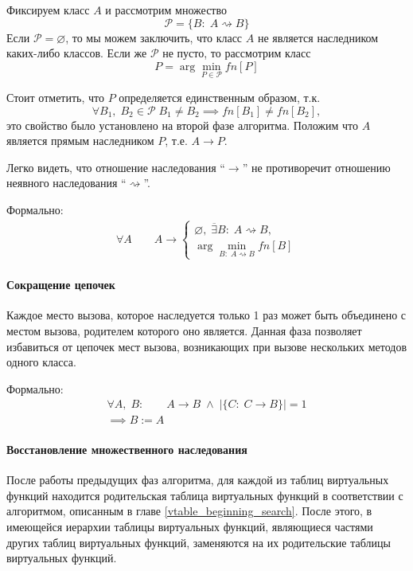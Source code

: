 \documentclass[a4paper,12pt,russian]{article}
\begin{document}
Фиксируем класс $A$ и рассмотрим множество \[\mathcal{P} = \{B:\; A \rightsquigarrow B\}\]
Если $\mathcal{P} = \varnothing$, то мы можем заключить, что класс $A$ не является наследником каких-либо классов. Если же $\mathcal{P}$ не пусто, то рассмотрим класс \[P = \arg \min_{P \in \mathcal{P}}fn[P]\]

Стоит отметить, что $P$ определяется единственным образом, т.к. \[\forall B_1,\;B_2 \in \mathcal{P}\; B_1 \neq B_2 \implies fn[B_1] \neq fn[B_2],\]
это свойство было установлено на второй фазе алгоритма.
Положим что $A$ является прямым наследником $P$, т.е. $A \rightarrow P$.

Легко видеть, что отношение наследования ``$\rightarrow$'' не противоречит отношению неявного наследования ``$\rightsquigarrow$''.

Формально:
\begin{eqnarray*}
\forall A\qquad A \rightarrow \begin{cases}
\varnothing,\; \overline{\exists} B:\; A \rightsquigarrow B,\\
\arg\min\limits_{B:\; A \rightsquigarrow B}fn[B]
\end{cases}
\end{eqnarray*}

\paragraph{Сокращение цепочек}
Каждое место вызова, которое наследуется только 1 раз может быть объединено с местом вызова, родителем которого оно является.
Данная фаза позволяет избавиться от цепочек мест вызова, возникающих при вызове нескольких методов одного класса.

Формально:
\begin{eqnarray*}
\forall A,\;B:\qquad A \rightarrow B\;\wedge\;|\{C:\; C \rightarrow B\}| = 1\\
\implies B := A
\end{eqnarray*}

\paragraph{Восстановление множественного наследования}
После работы предыдущих фаз алгоритма, для каждой из таблиц виртуальных функций находится родительская таблица виртуальных функций в соответствии с алгоритмом, описанным в главе \ref{vtable_beginning_search}.
После этого, в имеющейся иерархии таблицы виртуальных функций, являющиеся частями других таблиц виртуальных функций, заменяются на их родительские таблицы виртуальных функций.
\end{document}
